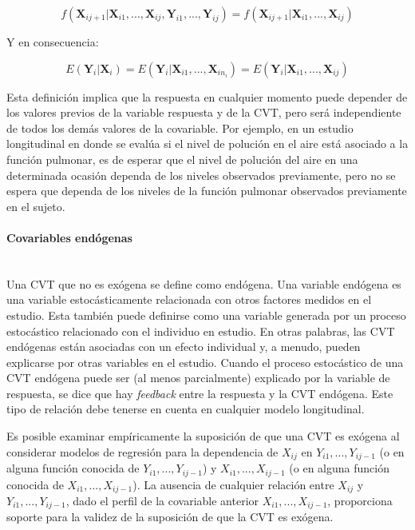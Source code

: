 \documentclass[spanish]{article}
\numberwithin{figure}{subsection}
\numberwithin{equation}{subsection}
\numberwithin{table}{subsection}
\begin{document}
\begin{equation}
	\label{exogeneidad}
	f(\bm{X}_{ij+1}|\bm{X}_{i1}, ..., \bm{X}_{ij}, \bm{Y}_{i1}, ..., \bm{Y}_{ij}) =
	f(\bm{X}_{ij+1}|\bm{X}_{i1}, ..., \bm{X}_{ij})
\end{equation}

Y en consecuencia:

\begin{equation}
	\label{exogeneidad debil}
	E(\bm{Y}_i|\bm{X}_i) = E(\bm{Y}_i|\bm{X}_{i1}, ..., \bm{X}_{in_i}) = E(\bm{Y}_i|\bm{X}_{i1}, ..., \bm{X}_{ij})
\end{equation}

Esta definición implica que la respuesta en cualquier momento puede depender de
los valores previos de la variable respuesta y de la CVT, pero será
independiente de todos los demás valores de la covariable. Por ejemplo, en un
estudio longitudinal en donde se evalúa si el nivel de polución en el aire está
asociado a la función pulmonar, es de esperar que el nivel de polución del aire
en una determinada ocasión dependa de los niveles observados previamente, pero
no se espera que dependa de los niveles de la función pulmonar observados
previamente en el sujeto.

\paragraph{Covariables endógenas} \mbox{} \\

Una CVT que no es exógena se define como endógena. Una variable endógena es una
variable estocásticamente relacionada con otros factores medidos en el estudio.
Esta también puede definirse como una variable generada por un proceso
estocástico relacionado con el individuo en estudio. En otras palabras, las CVT
endógenas están asociadas con un efecto individual y, a menudo, pueden
explicarse por otras variables en el estudio. Cuando el proceso estocástico de
una CVT endógena puede ser (al menos parcialmente) explicado por la variable de
respuesta, se dice que hay \textit{feedback} entre la respuesta y la CVT
endógena. Este tipo de relación debe tenerse en cuenta en cualquier modelo
longitudinal.

Es posible examinar empíricamente la suposición de que una CVT es exógena al
considerar modelos de regresión para la dependencia de $X_{ij}$ en
$Y_{i1}, ..., Y_{ij-1}$ (o en alguna función conocida de
$Y_{i1}, ..., Y_{ij-1}$) y $X_{i1}, ..., X_{ij-1}$ (o en alguna función conocida
de $X_{i1}, ..., X_{ij-1}$). La ausencia de cualquier relación entre $X_{ij}$ y
$Y_{i1}, ..., Y_{ij-1}$, dado el perfil de la covariable anterior
$X_{i1}, ..., X_{ij-1}$, proporciona soporte para la validez de la suposición de
que la CVT es exógena.
\end{document}

